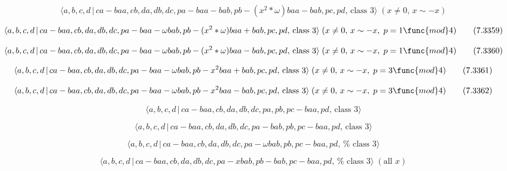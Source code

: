 \documentclass[10pt]{article}
\begin{document}
\begin{equation}
\langle a,b,c,d\,|\,ca-baa,cb,da,db,dc,pa-baa-bab,pb-(x^{2}\ast \omega
)baa-bab,pc,pd,\,\text{class }3\rangle \;(x\neq 0,\,x\sim -x)  \tag{7.3358}
\end{equation}

\begin{equation}
\langle a,b,c,d\,|\,ca-baa,cb,da,db,dc,pa-baa-\omega bab,pb-(x^{2}\ast
\omega )baa+bab,pc,pd,\,\text{class }3\rangle \;(x\neq 0,\,x\sim -x,\;p=1%
\func{mod}4)  \tag{7.3359}
\end{equation}

\begin{equation}
\langle a,b,c,d\,|\,ca-baa,cb,da,db,dc,pa-baa-\omega bab,pb-(x^{2}\ast
\omega )baa-bab,pc,pd,\,\text{class }3\rangle \;(x\neq 0,\,x\sim -x,\;p=1%
\func{mod}4)  \tag{7.3360}
\end{equation}

\begin{equation}
\langle a,b,c,d\,|\,ca-baa,cb,da,db,dc,pa-baa-\omega
bab,pb-x^{2}baa+bab,pc,pd,\,\text{class }3\rangle \;(x\neq 0,\,x\sim -x,\;p=3%
\func{mod}4)  \tag{7.3361}
\end{equation}

\begin{equation}
\langle a,b,c,d\,|\,ca-baa,cb,da,db,dc,pa-baa-\omega
bab,pb-x^{2}baa-bab,pc,pd,\,\text{class }3\rangle \;(x\neq 0,\,x\sim -x,\;p=3%
\func{mod}4)  \tag{7.3362}
\end{equation}

\begin{equation}
\langle a,b,c,d\,|\,ca-baa,cb,da,db,dc,pa,pb,pc-baa,pd,\,\text{class }%
3\rangle  \tag{7.3363}
\end{equation}

\begin{equation}
\langle a,b,c,d\,|\,ca-baa,cb,da,db,dc,pa-bab,pb,pc-baa,pd,\,\text{class }%
3\rangle  \tag{7.3364}
\end{equation}

\begin{equation}
\langle a,b,c,d\,|\,ca-baa,cb,da,db,dc,pa-\omega bab,pb,pc-baa,pd,\,\text{%
class }3\rangle  \tag{7.3365}
\end{equation}

\begin{equation}
\langle a,b,c,d\,|\,ca-baa,cb,da,db,dc,pa-xbab,pb-bab,pc-baa,pd,\,\text{%
class }3\rangle \;(\text{all }x)  \tag{7.3366}
\end{equation}
\end{document}
